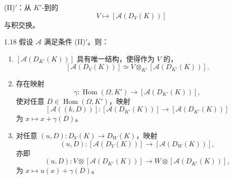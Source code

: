 (II)$'$：从 $K'$-到的
\[V\longmapsto[\mathcal A(D_V(K))]\]
与积交换。
\begin{SGAresult}{}{1.18}
假设 $\mathcal A$ 满足条件 (II)$'$。则：
\begin{enumerate}
\item[(1)] $[\mathcal A(D_{K'}(K))]$ 具有唯一结构，使得作为 $V$ 的，
\[[\mathcal A(D_V(K))]\simeq V\otimes_{K'}[\mathcal A(D_{K'}(K))].\]
\item[(2)] 存在映射
\[\gamma:\operatorname{Hom}(\Omega,K')\longrightarrow[\mathcal A(D_{K'}(K))],\]
使对任意 $D\in\operatorname{Hom}(\Omega,K')$，映射
\[[\mathcal A((k,D))]:[\mathcal A(D_{K'}(K))]\longrightarrow[\mathcal A(D_{K'}(K))]\]
为 $x\mapsto x+\gamma(D)$。
\item[(3)] 对任意 $(u,D):D_V(K)\to D_W(K)$，映射
\[(u,D):[\mathcal A(D_V(K))]\longrightarrow[\mathcal A(D_W(K))],\]
亦即
\[(u,D):V\otimes[\mathcal A(D_{K'}(K))]\longrightarrow W\otimes[\mathcal A(D_{K'}(K))],\]
为 $x\mapsto u(x)+\gamma(D)$。
\end{enumerate}
\end{SGAresult}
